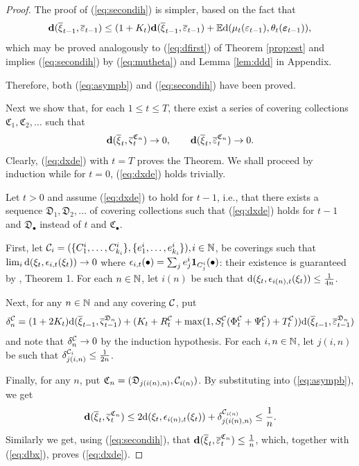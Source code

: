 \documentclass{article}              %
\begin{document}
\begin{proof}
The proof of (\ref{eq:secondih}) is simpler, based on the fact that
\[
\mathbf{d}(\overline{\xi}_{t-1},\overline{\varepsilon}_{t-1})\leq(1+K_{t})\mathbf{d}(\overline{\xi}_{t-1},\overline{\varepsilon}_{t-1})+\mathbb{E}\mathrm{d}(\mu_{t}(\varepsilon_{t-1}),\theta_{t}(\boldsymbol{\varepsilon}_{t-1})),
\]
which may be proved analogously to (\ref{eq:dfirst}) of Theorem \ref{prop:est} and
implies (\ref{eq:secondih}) by (\ref{eq:mutheta}) and Lemma
\ref{lem:ddd} in Appendix.

Therefore, both (\ref{eq:asympb}) and (\ref{eq:secondih}) have been proved.

Next we show that, for each $1\leq t\leq T$, there exist a series
of covering collections $\mathfrak{C}_{1},\mathfrak{C}_{2},\dots$
such that 
\begin{equation}
\mathbf{d}(\overline{\xi}_{t},\overline{\varsigma}_{t}^{\mathfrak{C}_{n}})\rightarrow0,\qquad \mathbf{d}(\overline{\xi}_{t},\overline{\varepsilon}_{t}^{\mathfrak{C}_{n}})\rightarrow0.\label{eq:dxde}
\end{equation}
 Clearly, (\ref{eq:dxde}) with $t=T$ proves the Theorem. We shall proceed by induction while  for $t=0$, (\ref{eq:dxde}) holds trivially. 

Let $t>0$ and assume (\ref{eq:dxde}) to hold for $t-1$, i.e., that there
exists a sequence $\mathfrak{D}_{1},\mathfrak{D}_{2},\dots$ of covering
collections such that (\ref{eq:dxde}) holds for $t-1$ and $\mathfrak{D_{\bullet}}$ instead of
$t$ and $\mathfrak{C_{\bullet}}$. 


First, let $\mathcal{C}_{i}=(\{C_{1}^{i},\dots,C_{k_{i}}^{i}\},\{e_{1}^{i},\dots,e_{k_{i}}^{i}\}),$$i\in\mathbb{N}$,
be coverings such that $\lim_{i}\mathrm{d}(\xi_{t},\epsilon_{i,t}(\xi_{t}))\rightarrow0$
where $\epsilon_{i,t}(\bullet)=\sum_{j}e_{j}^{i}\mathbf{1}_{C_{j}^{i}}(\bullet)$: their existence is guaranteed by \cite{Smid09c}, Theorem 1. For
each $n\in\mathbb{N}$, let $i(n)$ be such that $\mathrm{d}(\xi_{t},\epsilon_{i(n),t}(\xi_{t}))\leq\frac{1}{4n}$.

Next, for any $n\in \mathbb{N}$ and any covering $\mathcal{C}$, put 
\begin{equation}
\delta_{n}^{\mathcal{C}}=(1+2K_{t})\mathrm{d}(\overline{\xi}_{t-1},\overline{\varsigma}_{t-1}^{\mathfrak{D}_{n}})
+(K_{t}+R_{t}^{\mathcal{C}}+\max(1,S_{t}^{\mathcal{C}}(\Phi_{t}^{\mathcal{C}}+\Psi_{t}^{\mathcal{C}})+T_{t}^{\mathcal{C}}))\mathrm{d}(\overline{\xi}_{t-1},\overline{\varepsilon}_{t-1}^{\mathfrak{D}_{n}})\label{eq:deltac}
\end{equation}
and note that $\delta_{n}^{\mathcal{C}}\rightarrow0$ by the induction hypothesis. 
For each $i,n\in\mathbb{N}$, let $j(i,n)$ be such that $\delta_{j(i,n)}^{\mathcal{C}_{i}}\leq\frac{1}{2n}$.

Finally, for any $n$, put $\mathfrak{C}_{n}=(\mathfrak{D}_{j(i(n),n)},\mathcal{C}_{i(n)})$.
By substituting into (\ref{eq:asympb}), we get 
\begin{equation}
\mathbf{d}(\overline{\xi}_{t},\overline{\varsigma}_{t}^{\mathfrak{C}_{n}})\leq2\mathrm{d}(\xi_{t},\epsilon_{i(n),t}(\xi_{t}))+\delta_{j(i(n),n)}^{\mathcal{C}_{i(n)}}\leq\frac{1}{n}.
\label{eq:dbx}
\end{equation}
Similarly we get, using (\ref{eq:secondih}), that $\mathbf{d}(\overline{\xi}_{t},\overline{\varepsilon}_{t}^{\mathfrak{C}_{n}})\leq\frac{1}{n}$,
which, together with (\ref{eq:dbx}), proves (\ref{eq:dxde}).
\end{proof}
\end{document}
